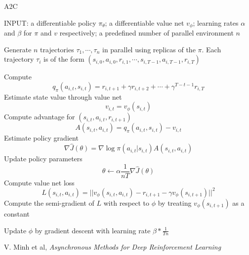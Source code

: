 \documentclass{article}
\begin{document}
\begin{algorithm}[H]
  \caption{A2C}
\end{algorithm}
\begin{algorithmic}[1]
  \STATE INPUT: a differentiable policy $\pi_{\theta}$; 
  a differentiable value net $v_{\phi}$; learning rates
  $\alpha$ and $\beta$ for $\pi$ and $v$ respectively;
  a predefined number of parallel environment $n$
  
  \REPEAT
  \STATE Generate $n$ trajectories $\tau_1, \cdots, \tau_n$ in parallel 
  using replicas of the $\pi$. Each trajectory $\tau_i$ is of the form 
  $(s_{i,0}, a_{i,0}, r_{i,1}, \cdots, s_{i,T-1}, a_{i,T-1}, r_{i,T})$

      \STATE Compute
      \[
        q_{\pi}(a_{i,t}, s_{i,t})  = r_{i,t+1}+\gamma r_{i,t+2} + \cdots + 
          \gamma^{T-t-1}r_{i,T}
      \]
      \STATE Estimate state value through value net
      \[
        v_{i,t} = v_{\phi}(s_{i,t})
      \]
      \STATE Compute advantage for $(s_{i,t}, a_{i,t}, r_{i,t+1})$
      \[
         A(s_{i,t}, a_{i,t}) = q_{\pi}(a_{i,t}, s_{i,t}) - v_{i,t}
      \]
      \STATE Estimate policy gradient
      \[
         \nabla \hat J(\theta) = \nabla \log\pi(a_{i,t}|s_{i,t})A(s_{i,t}, 
          a_{i,t})
        \]
      \STATE Update policy parameters
      \[
         \theta \leftarrow \alpha\frac{1}{nT}\nabla \hat J(\theta)
       \]
      \STATE Compute value net loss
      \[
         L(s_{i,t}, a_{i,t}) = ||v_{\phi}(s_{i,t},a_{i,t}) - r_{i,t+1} - 
          \gamma v_{\phi}(s_{i,t+1}) ||^2
      \]
      \STATE Compute the semi-gradient of $L$ with respect to $\phi$ by 
      treating $v_{\phi}(s_{i,t+1})$ as a constant
      
      \STATE Update $\phi$ by gradient descent with learning rate 
      $\beta * \frac{1}{Tn}$
    \ENDFOR
  \ENDFOR
\end{algorithmic}

\begin{thebibliography}{9}
  V. Minh et al, \emph{Asynchronous Methods for Deep Reinforcement Learning}

\end{thebibliography}
\end{document}
